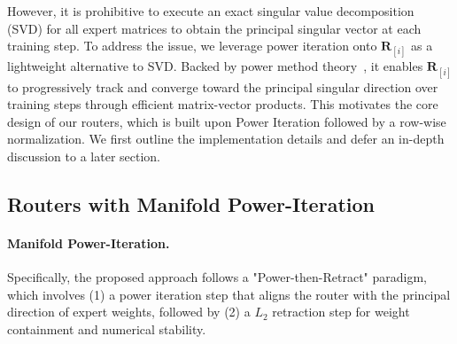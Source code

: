 \documentclass{llmxive}
\providecommand{\bm}[1]{\boldsymbol{#1}}
\providecommand{\mR}{{\bm{R}}}
\begin{document}
However, it is prohibitive to execute an exact singular value decomposition (SVD) for all expert matrices to obtain the principal singular vector at each training step.
To address the issue, we leverage power iteration onto $\mR_{[i]}$ as a lightweight alternative to SVD. 
Backed by power method theory~\cite{matrixcomputation}, it enables $\mathbf{R}_{[i]}$ to progressively track and converge toward the principal singular direction over training steps through efficient matrix-vector products.
This motivates the core design of our routers, which is built upon Power Iteration followed by a row-wise normalization.
We first outline the implementation details and defer an in-depth discussion to a later section.



\subsection{Routers with Manifold Power-Iteration}
\label{sec:definition}
\paragraph{Manifold Power-Iteration.}
Specifically, the proposed approach follows a "Power-then-Retract" paradigm, which involves (1) a power iteration step that aligns the router with the principal direction of expert weights,
followed by (2) a $L_2$ retraction step for weight containment and numerical stability.
\end{document}
